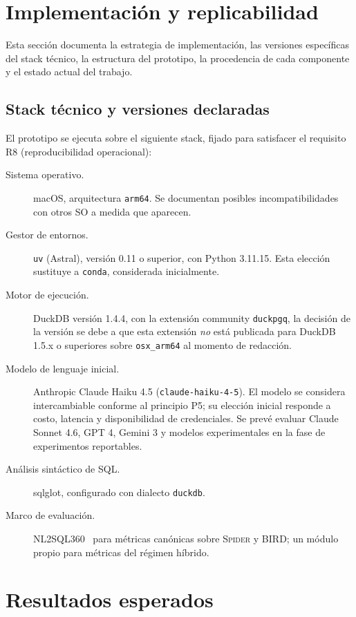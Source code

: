 \section{Implementación y replicabilidad}
\label{sec:prop-implementacion}

Esta sección documenta la estrategia de implementación, las versiones específicas del stack técnico, la estructura del prototipo, la procedencia de cada componente y el estado actual del trabajo.

\subsection{Stack técnico y versiones declaradas}
\label{subsec:prop-stack}

El prototipo se ejecuta sobre el siguiente stack, fijado para satisfacer el requisito R8 (reproducibilidad operacional):

\begin{description}
    \item[Sistema operativo.] macOS, arquitectura \texttt{arm64}. Se documentan posibles incompatibilidades con otros SO a medida que aparecen.
    \item[Gestor de entornos.] \texttt{uv} (Astral), versión 0.11 o superior, con Python 3.11.15. Esta elección sustituye a \texttt{conda}, considerada inicialmente.
    \item[Motor de ejecución.] DuckDB versión 1.4.4, con la extensión community \texttt{duckpgq}, la decisión de la versión se debe a que esta extensión \emph{no} está publicada para DuckDB 1.5.x o superiores sobre \texttt{osx\_arm64} al momento de redacción.
    \item[Modelo de lenguaje inicial.] Anthropic Claude Haiku 4.5 (\texttt{claude-haiku-4-5}). El modelo se considera intercambiable conforme al principio P5; su elección inicial responde a costo, latencia y disponibilidad de credenciales. Se prevé evaluar Claude Sonnet 4.6, GPT 4, Gemini 3 y modelos experimentales en la fase de experimentos reportables.
    \item[Análisis sintáctico de SQL.] sqlglot, configurado con dialecto \texttt{duckdb}.
    \item[Marco de evaluación.] NL2SQL360~\cite{SuperSQL2024} para métricas canónicas sobre \textsc{Spider} y \textsc{BIRD}; un módulo propio para métricas del régimen híbrido.
\end{description}

\section{Resultados esperados}
\label{sec:prop-resultados-esperados}

